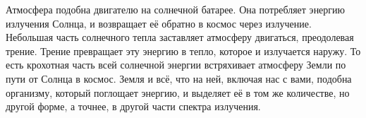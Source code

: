 Атмосфера подобна двигателю на солнечной батарее.
Она потребляет энергию излучения Солнца, и возвращает её обратно в космос через излучение.
Небольшая часть солнечного тепла заставляет атмосферу двигаться, преодолевая трение.
Трение превращает эту энергию в тепло, которое и излучается наружу.
То есть крохотная часть всей солнечной энергии встряхивает атмосферу Земли по пути от Солнца в космос.
Земля и всё, что на ней, включая нас с вами, подобна организму, который поглощает энергию, и выделяет её в том же количестве, но другой форме, а точнее, в другой части спектра излучения.
